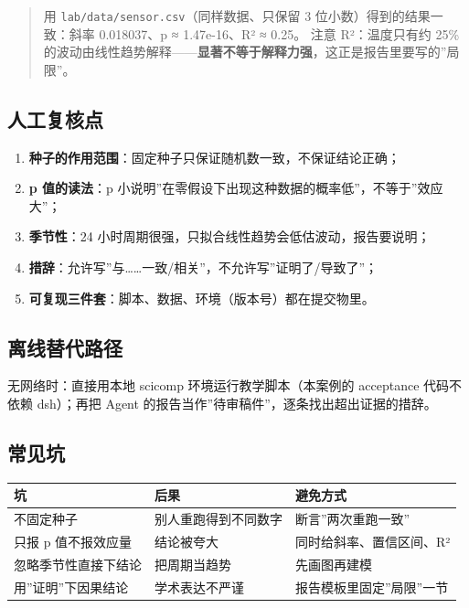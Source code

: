 \begin{Shaded}
\begin{Highlighting}[]
\end{Highlighting}
\end{Shaded}

\begin{quote}
用 \texttt{lab/data/sensor.csv}（同样数据、只保留 3
位小数）得到的结果一致：斜率 0.018037、p ≈ 1.47e-16、R² ≈ 0.25。 注意
R²：温度只有约 25\%
的波动由线性趋势解释------\textbf{显著不等于解释力强}，这正是报告里要写的''局限''。
\end{quote}

\subsection{人工复核点}\label{ux4ebaux5de5ux590dux6838ux70b9-1}

\begin{enumerate}
\def\labelenumi{\arabic{enumi}.}
\tightlist
\item
  \textbf{种子的作用范围}：固定种子只保证随机数一致，不保证结论正确；
\item
  \textbf{p 值的读法}：p
  小说明''在零假设下出现这种数据的概率低''，不等于''效应大''；
\item
  \textbf{季节性}：24
  小时周期很强，只拟合线性趋势会低估波动，报告要说明；
\item
  \textbf{措辞}：允许写''与\ldots\ldots 一致/相关''，不允许写''证明了/导致了''；
\item
  \textbf{可复现三件套}：脚本、数据、环境（版本号）都在提交物里。
\end{enumerate}

\subsection{离线替代路径}\label{ux79bbux7ebfux66ffux4ee3ux8defux5f84-1}

无网络时：直接用本地 scicomp 环境运行教学脚本（本案例的 acceptance
代码不依赖 dsh）；再把 Agent
的报告当作''待审稿件''，逐条找出超出证据的措辞。

\subsection{常见坑}\label{ux5e38ux89c1ux5751-2}

{\def\LTcaptype{none} %
\begin{longtable}[]{@{}lll@{}}
\toprule\noalign{}
坑 & 后果 & 避免方式 \\
\midrule\noalign{}
\endhead
\bottomrule\noalign{}
\endlastfoot
不固定种子 & 别人重跑得到不同数字 & 断言''两次重跑一致'' \\
只报 p 值不报效应量 & 结论被夸大 & 同时给斜率、置信区间、R² \\
忽略季节性直接下结论 & 把周期当趋势 & 先画图再建模 \\
用''证明''下因果结论 & 学术表达不严谨 & 报告模板里固定''局限''一节 \\
\end{longtable}
}

